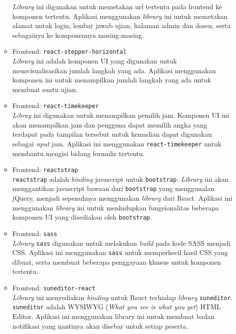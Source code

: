 \begin{itemize}
\begin{itemize}
                    \textit{Library} ini digunakan untuk memetakan url tertentu pada frontend ke komponen tertentu.
                    Aplikasi menggunakan \textit{library} ini untuk memetakan alamat untuk login, lembar jawab ujian,
                    halaman admin dan dosen, serta sebagainya ke komponennya masing-masing.
                \item Frontend: \texttt{react-stepper-horizontal} \\
                    \textit{Library} ini adalah komponen UI yang digunakan untuk memvisualisasikan
                    jumlah langkah yang ada. Aplikasi menggunakan komponen ini untuk menampilkan jumlah 
                    langkah yang ada untuk membuat suatu ujian.
                \item Frontend: \texttt{react-timekeeper} \\
                    \textit{Libray} ini digunakan untuk menampilkan pemilih jam. Komponen UI ini akan menampilkan
                    jam dan pengguna dapat memilih angka yang terdapat pada tampilan tersebut untuk kemudian
                    dapat digunakan sebagai \textit{nput} jam. Aplikasi ini menggunakan \texttt{react-timekeeper}
                    untuk membantu mengisi bidang formulir tertentu.
                \item Frontend: \texttt{reactstrap} \\
                    \texttt{reactstrap} adalah \textit{binding} javascript untuk \texttt{bootstrap}. \textit{Library}
                    ini akan menggantikan javascript bawaan dari \texttt{bootstrap} yang menggunalan jQuery, menjadi
                    sepenuhnya menggunakan \textit{library} dari React. Aplikasi ini menggunakan \textit{library}
                    ini untuk menhidupkan fungsionalitas beberapa komponen UI yang disediakan oleh \texttt{bootstrap}.
                \item Frontend: \texttt{sass} \\
                    \textit{Library} \texttt{sass} digunakan untuk melakukan \textit{build} pada kode SASS menjadi CSS.
                    Aplikasi ini menggunakan \texttt{sass} untuk memperkecil hasil CSS yang dibuat, serta membuat
                    beberapa penggayaan khusus untuk komponen tertentu.
                \item Frontend: \texttt{suneditor-react} \\
                    \textit{Library} ini menyediakan \textit{binding} untuk React terhadap \textit{library}
                    \texttt{suneditor}. \texttt{suneditor} adalah WYSIWYG (\textit{What you see is what you get})
                    HTML Editor. Aplikasi ini menggunakan library ini untuk membuat badan notifikasi yang nantinya
                    akan disebar untuk setiap peserta.
            \end{itemize}
    \end{itemize}


